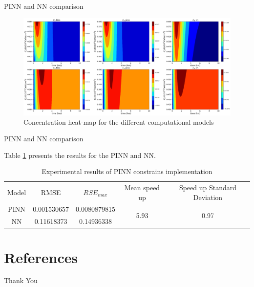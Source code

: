 \documentclass[serif,8pt, aspectratio=169]{beamer}
\begin{document}
\begin{frame}[fragile]{PINN and NN comparison}
    \begin{figure}
        \centering
        \includegraphics[width=0.95\linewidth]{pic/conc_heat_plot.png}
        \caption{Concentration heat-map for the different computational models}
        \label{fig:enter-label}
    \end{figure}
\end{frame}

\begin{frame}[fragile]{PINN and NN comparison}

    Table \ref{tab:results} presents the results for the PINN and NN.
    
        \begin{table}[htb!]
        \centering
        \caption{Experimental results of PINN constrains implementation}
        \label{tab:results}
        \begin{tabular}{ccccc}
        \cline{1-5}
        Model & RMSE        & $RSE_{max}$ & Mean speed up              & Speed up Standard Deviation \\ \cline{1-5}
        PINN  & 0.001530657 & 0.0080879815   & \multirow{2}{*}{5.93} & \multirow{2}{*}{0.97} \\
        NN    & 0.11618373   & 0.14936338     &                            &                            
        \end{tabular}
        \end{table}

\end{frame}

\section{References}

\begin{frame}[allowframebreaks]
    
    
\end{frame}


\begin{frame}
    \begin{center}
        {\Huge\calligra Thank You}
    \end{center}
\end{frame}
\end{document}
